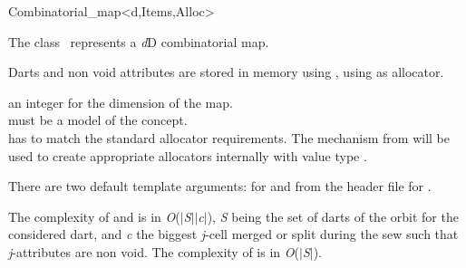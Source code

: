 \ccRefPageBegin

\begin{ccRefClass}{Combinatorial_map<d,Items,Alloc>}


\ccDefinition
  
The class \ccRefName\ represents a \emph{d}D combinatorial map.

Darts and non void attributes are stored in memory using
, using  as allocator.

\ccIsModel
{}

\ccParameters
{} an integer for the dimension of the map.\\
 must be a model of the  concept. \\
 has to match the standard allocator requirements. The   mechanism from 
 will be used to create appropriate allocators internally with value type .

There are two default template arguments:
 for  and
 from the  header file for .

\ccTypes
{}
\ccGlue
{}


The complexity of  and  is in \emph{O}($|$\emph{S}$|$\mytimes{}$|$\emph{c}$|$), \emph{S}
being the set of darts of the orbit
\orbit{\betaun{},\myldots{},\betaimdeux{},\betaipdeux{},\myldots{},\betad{}} for the
considered dart, and \emph{c} the biggest \emph{j}-cell merged or
split during the sew such that \emph{j}-attributes are non void. 
The complexity of  is in \emph{O}($|$\emph{S}$|$).


\end{ccRefClass}
